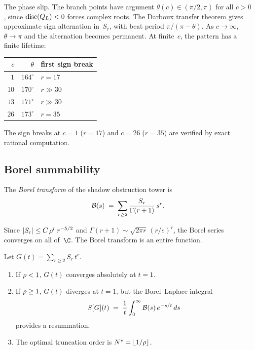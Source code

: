The phase slip. The branch points have argument
$\theta(c) \in (\pi/2, \pi)$ for all $c > 0$, since
$\operatorname{disc}(Q_L) < 0$ forces complex roots.
The Darboux transfer theorem gives approximate sign alternation
in~$S_r$, with beat period $\pi/(\pi - \theta)$. As
$c \to \infty$, $\theta \to \pi$ and the alternation becomes
permanent. At finite~$c$, the pattern has a finite lifetime:
\begin{center}
\small
\renewcommand{\arraystretch}{1.15}
\begin{tabular}{rrl}
$c$ & $\theta$ & first sign break \\ \hline
$1$ & $164^\circ$ & $r = 17$ \\
$10$ & $170^\circ$ & $r \gg 30$ \\
$13$ & $171^\circ$ & $r \gg 30$ \\
$26$ & $173^\circ$ & $r = 35$
\end{tabular}
\end{center}
The sign breaks at $c = 1$ ($r = 17$) and $c = 26$ ($r = 35$)
are verified by exact rational computation.


\subsection{Borel summability}
\label{subsec:comp-borel}

\begin{definition}
\label{def:comp-borel-transform}
The \emph{Borel transform} of the shadow obstruction tower is
\begin{equation}\label{eq:comp-borel-transform}
 \mathcal{B}(s) \;=\; \sum_{r \geq 2}
 \frac{S_r}{\Gamma(r+1)}\, s^r.
\end{equation}
\end{definition}

Since $|S_r| \leq C\, \rho^r\, r^{-5/2}$ and
$\Gamma(r+1) \sim \sqrt{2\pi r}\,(r/e)^r$, the Borel series
converges on all of~$\C$. The Borel transform is an entire
function.

\begin{proposition}
\label{prop:comp-borel-summability}
\ClaimStatusProvedHere
Let $G(t) = \sum_{r \geq 2} S_r\, t^r$.
\begin{enumerate}[label=\textup{(\roman*)}]
\item If $\rho < 1$, $G(t)$ converges absolutely at
 $t = 1$.
\item If $\rho \geq 1$, $G(t)$ diverges at $t = 1$,
 but the Borel--Laplace integral
 \[
 S[G](t) \;=\; \frac{1}{t}
 \int_0^\infty \mathcal{B}(s)\, e^{-s/t}\, ds
 \]
 provides a resummation.
\item The optimal truncation order is
 $N^* = \lfloor 1/\rho \rfloor$.
\end{enumerate}
\end{proposition}

